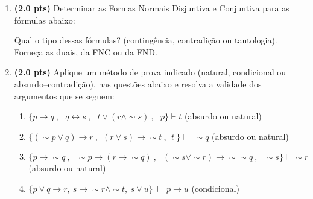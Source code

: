 \documentclass[11pt, a4paper,final]{article}
\begin{document}
\begin{enumerate}

\item {\bf (2.0 pts)} Determinar as Formas Normais Disjuntiva e Conjuntiva para as fórmulas abaixo:
Qual o tipo dessas fórmulas? (contingência, contradição ou tautologia). Forneça as duais, da FNC ou  da FND.


\item {\bf (2.0 pts)} Aplique um método de prova indicado (natural, condicional ou absurdo--contradição), nas questões abaixo e resolva a validade dos argumentos que se seguem: 

\begin{enumerate}
\item $\{p\rightarrow  q \: , \:\:\: q \leftrightarrow s \: , \:\:\:
 t \vee ( r \wedge \sim s)\: , \:\:\: p \} \vdash  t $ \hskip 1cm (absurdo ou natural)
 
\item  $\{ ( \sim p \vee q) \rightarrow r \: ,
  \:\: (r \vee s)  \rightarrow \sim t \: ,
    \:\: t \:   \} \vdash \: \:  \sim  q $ \hskip 1cm (absurdo ou natural)

\item $\{p\rightarrow \sim q \: , \:\:\: \sim p \rightarrow (r \rightarrow \sim q)  \: , \:\:\: (\sim s \vee \sim r)\rightarrow \sim \sim q  \: , \:\:\: \sim s  \} \vdash  \sim r $ \hskip 1cm (absurdo ou natural)

\item $ \{ p \vee q \rightarrow r,~ s \rightarrow \sim r \wedge \sim t,~ s \vee u \} ~\vdash~ p \rightarrow u $ \hskip 1cm (condicional)
\end{enumerate}

\begin{comment}
\begin{enumerate}


\end{comment}
\end{enumerate}
\end{document}
